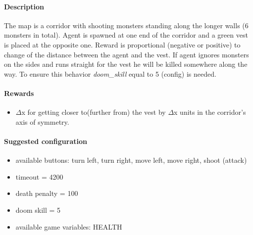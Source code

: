 \documentclass[english,bachelor,a4paper,twoside]{ppfcmthesis}
\begin{document}
		\paragraph{Description}
			The map is a corridor with shooting monsters standing along the longer walls (6 monsters in total). Agent is spawned at one end of the corridor and a green vest is placed at the opposite one. Reward is proportional (negative or positive) to change of the distance between the agent and the vest. If agent ignores monsters on the sides and runs straight for the vest he will be killed somewhere along the way. To ensure this behavior \textit{doom\_skill} equal to 5 (config) is needed.

		\paragraph{Rewards}
			\begin{itemize}
				\item $\Delta$x for getting closer to(further from) the vest by $\Delta$x units in the corridor's axis of symmetry.
			\end{itemize}
			
		\paragraph{Suggested configuration}
			\begin{itemize}
				\item available buttons: turn left, turn right, move left, move right, shoot (attack)
				\item timeout = 4200
				\item death penalty = 100
				\item doom skill = 5
				\item available game variables: HEALTH
			\end{itemize}
	\newpage
\end{document}

